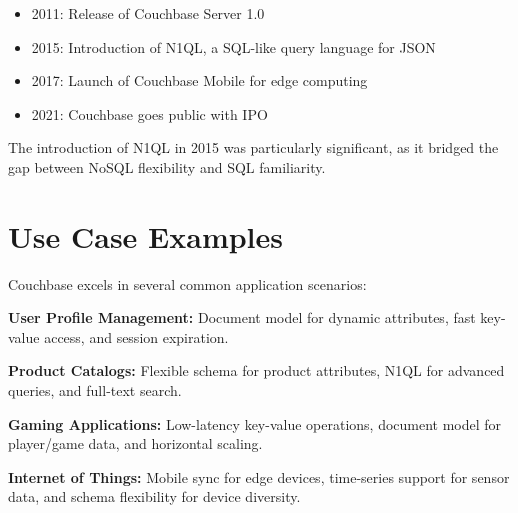 \begin{itemize}
  \item 2011: Release of Couchbase Server 1.0
  \item 2015: Introduction of N1QL, a SQL-like query language for JSON
  \item 2017: Launch of Couchbase Mobile for edge computing
  \item 2021: Couchbase goes public with IPO
\end{itemize}

The introduction of N1QL in 2015 was particularly significant, as it bridged the gap between NoSQL flexibility and SQL familiarity.

\section{Use Case Examples}

Couchbase excels in several common application scenarios:

\textbf{User Profile Management:} Document model for dynamic attributes, fast key-value access, and session expiration.

\textbf{Product Catalogs:} Flexible schema for product attributes, N1QL for advanced queries, and full-text search.

\textbf{Gaming Applications:} Low-latency key-value operations, document model for player/game data, and horizontal scaling.

\textbf{Internet of Things:} Mobile sync for edge devices, time-series support for sensor data, and schema flexibility for device diversity.